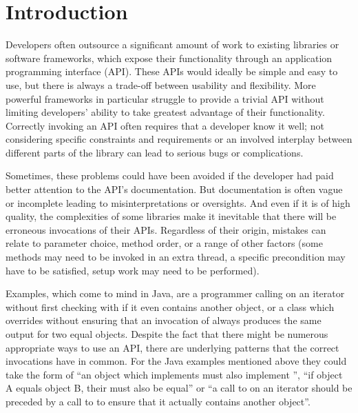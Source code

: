 \chapter{Introduction}\label{ch:intro}

Developers often outsource a significant amount of work to existing libraries or software frameworks, which expose their functionality through an application programming interface (API).
These APIs would ideally be simple and easy to use, but there is always a trade-off between usability and flexibility.
More powerful frameworks in particular struggle to provide a trivial API without limiting developers' ability to take greatest advantage of their functionality.
Correctly invoking an API often requires that a developer know it well; not considering specific constraints and requirements or an involved interplay between different parts of the library can lead to serious bugs or complications.

Sometimes, these problems could have been avoided if the developer had paid better attention to the API's documentation.
But documentation is often vague or incomplete leading to misinterpretations or oversights.
And even if it is of high quality, the complexities of some libraries make it inevitable that there will be erroneous invocations of their APIs.
Regardless of their origin, mistakes can relate to parameter choice, method order, or a range of other factors (some methods may need to be invoked in an extra thread, a specific precondition may have to be satisfied, setup work may need to be performed).

Examples, which come to mind in Java, are a programmer calling  on an iterator without first checking with  if it even contains another object, or a class which overrides  without ensuring that an invocation of  always produces the same output for two equal objects.
Despite the fact that there might be numerous appropriate ways to use an API, there are underlying patterns that the correct invocations have in common.
For the Java examples mentioned above they could take the form of ``an object which implements  must also implement '', ``if object A equals object B, their  must also be equal'' or ``a call to  on an iterator should be preceded by a call to  to ensure that it actually contains another object''.

